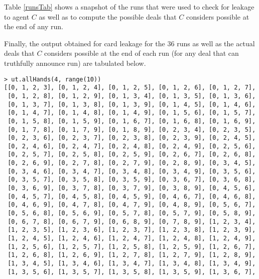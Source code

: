 \documentclass{article}
\begin{document}

Table \ref{runsTab} shows a snapshot of the runs that were
used to check for leakage to agent $C$ as well as to compute the possible
deals that $C$ considers possible at the end of any run.




Finally, the output obtained for card leakage for the $36$ runs 
as well as the actual deals that $C$ considers possible at the
end of each run (for any deal that can truthfully announce run)
are tabulated below.
%


\newpage
\begin{table}
\begin{verbatim}
> ut.allHands(4, range(10))
[[0, 1, 2, 3], [0, 1, 2, 4], [0, 1, 2, 5], [0, 1, 2, 6], [0, 1, 2, 7], 
 [0, 1, 2, 8], [0, 1, 2, 9], [0, 1, 3, 4], [0, 1, 3, 5], [0, 1, 3, 6], 
 [0, 1, 3, 7], [0, 1, 3, 8], [0, 1, 3, 9], [0, 1, 4, 5], [0, 1, 4, 6], 
 [0, 1, 4, 7], [0, 1, 4, 8], [0, 1, 4, 9], [0, 1, 5, 6], [0, 1, 5, 7], 
 [0, 1, 5, 8], [0, 1, 5, 9], [0, 1, 6, 7], [0, 1, 6, 8], [0, 1, 6, 9], 
 [0, 1, 7, 8], [0, 1, 7, 9], [0, 1, 8, 9], [0, 2, 3, 4], [0, 2, 3, 5], 
 [0, 2, 3, 6], [0, 2, 3, 7], [0, 2, 3, 8], [0, 2, 3, 9], [0, 2, 4, 5],
 [0, 2, 4, 6], [0, 2, 4, 7], [0, 2, 4, 8], [0, 2, 4, 9], [0, 2, 5, 6], 
 [0, 2, 5, 7], [0, 2, 5, 8], [0, 2, 5, 9], [0, 2, 6, 7], [0, 2, 6, 8], 
 [0, 2, 6, 9], [0, 2, 7, 8], [0, 2, 7, 9], [0, 2, 8, 9], [0, 3, 4, 5], 
 [0, 3, 4, 6], [0, 3, 4, 7], [0, 3, 4, 8], [0, 3, 4, 9], [0, 3, 5, 6], 
 [0, 3, 5, 7], [0, 3, 5, 8], [0, 3, 5, 9], [0, 3, 6, 7], [0, 3, 6, 8], 
 [0, 3, 6, 9], [0, 3, 7, 8], [0, 3, 7, 9], [0, 3, 8, 9], [0, 4, 5, 6], 
 [0, 4, 5, 7], [0, 4, 5, 8], [0, 4, 5, 9], [0, 4, 6, 7], [0, 4, 6, 8],
 [0, 4, 6, 9], [0, 4, 7, 8], [0, 4, 7, 9], [0, 4, 8, 9], [0, 5, 6, 7], 
 [0, 5, 6, 8], [0, 5, 6, 9], [0, 5, 7, 8], [0, 5, 7, 9], [0, 5, 8, 9], 
 [0, 6, 7, 8], [0, 6, 7, 9], [0, 6, 8, 9], [0, 7, 8, 9], [1, 2, 3, 4], 
 [1, 2, 3, 5], [1, 2, 3, 6], [1, 2, 3, 7], [1, 2, 3, 8], [1, 2, 3, 9], 
 [1, 2, 4, 5], [1, 2, 4, 6], [1, 2, 4, 7], [1, 2, 4, 8], [1, 2, 4, 9], 
 [1, 2, 5, 6], [1, 2, 5, 7], [1, 2, 5, 8], [1, 2, 5, 9], [1, 2, 6, 7], 
 [1, 2, 6, 8], [1, 2, 6, 9], [1, 2, 7, 8], [1, 2, 7, 9], [1, 2, 8, 9], 
 [1, 3, 4, 5], [1, 3, 4, 6], [1, 3, 4, 7], [1, 3, 4, 8], [1, 3, 4, 9], 
 [1, 3, 5, 6], [1, 3, 5, 7], [1, 3, 5, 8], [1, 3, 5, 9], [1, 3, 6, 7], 

\end{verbatim}
\end{table}
\end{document}
